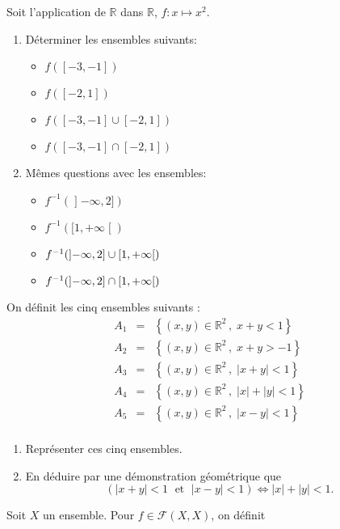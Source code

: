 \documentclass[10pt, a4paper, twocolumn]{homework}
\begin{document}
Soit l'application de $\mathbb{R}$ dans $\mathbb{R}$, 
$f\colon x\mapsto x^2$.
\begin{enumerate}
\item Déterminer les ensembles suivants:
  \begin{itemize}
    \item $f([-3,-1])$
    \item $f([-2,1])$
    \item $f([-3,-1]\cup[-2,1])$
    \item $f([-3,-1]\cap[-2,1])$
  \end{itemize}
   
\item Mêmes questions avec les ensembles:
  \begin{itemize}
    \item $f^{-1}(\mathopen]-\infty,2])$
    \item $f^{-1}([1,+\infty\mathclose[)$
    \item $f^{-1}(\mathopen]-\infty,2]\cup\nolinebreak{}[1,+\infty\mathclose[)$
    \item $f^{-1}(\mathopen]-\infty,2]\cap\nolinebreak{}[1,+\infty\mathclose[)$
  \end{itemize}
\end{enumerate}
On définit les cinq ensembles suivants :
\begin{eqnarray*}
A_1 & = & \left\{(x,y)\in\mathbb{R}^2\,,\; x+y<1\right\}\\
A_2 & = & \left\{(x,y)\in\mathbb{R}^2\,,\; x+y>-1\right\}\\
A_3 & = & \left\{(x,y)\in\mathbb{R}^2\,,\; |x+y|<1\right\}\\
A_4 & = & \left\{(x,y)\in\mathbb{R}^2\,,\; |x|+|y|<1\right\}\\
A_5 & = & \left\{(x,y)\in\mathbb{R}^2\,,\; |x-y|<1\right\}\\
\end{eqnarray*}

\begin{enumerate}
\item Représenter ces cinq ensembles.
\item En déduire par une démonstration géométrique que
$$(|x+y|<1\;\mbox{ et }\;|x-y|<1) \Leftrightarrow |x|+|y|<1.$$
\end{enumerate}
Soit $X$ un ensemble. Pour $f \in \mathcal{F} (X, X)$, on d\'efinit
\end{document}
